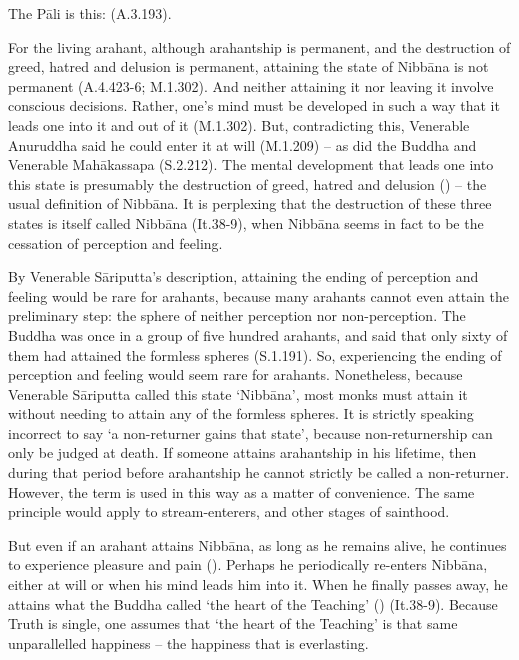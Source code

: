 The Pāli is this:  (A.3.193).

For the living arahant, although arahantship is permanent, and the destruction of greed, hatred and delusion is permanent, attaining the state of Nibbāna is not permanent (A.4.423-6; M.1.302). And neither attaining it nor leaving it involve conscious decisions. Rather, one's mind must be developed in such a way that it leads one into it and out of it (M.1.302). But, contradicting this, Venerable Anuruddha said he could enter it at will (M.1.209) -- as did the Buddha and Venerable Mahākassapa (S.2.212). The mental development that leads one into this state is presumably the destruction of greed, hatred and delusion () -- the usual definition of Nibbāna. It is perplexing that the destruction of these three states is itself called Nibbāna (It.38-9), when Nibbāna seems in fact to be the cessation of perception and feeling.

By Venerable Sāriputta's description, attaining the ending of perception and feeling would be rare for arahants, because many arahants cannot even attain the preliminary step: the sphere of neither perception nor non-perception. The Buddha was once in a group of five hundred arahants, and said that only sixty of them had attained the formless spheres (S.1.191). So, experiencing the ending of perception and feeling would seem rare for arahants. Nonetheless, because Venerable Sāriputta called this state `Nibbāna', most monks must attain it without needing to attain any of the formless spheres. It is strictly speaking incorrect to say `a non-returner gains that state', because non-returnership can only be judged at death. If someone attains arahantship in his lifetime, then during that period before arahantship he cannot strictly be called a non-returner. However, the term is used in this way as a matter of convenience. The same principle would apply to stream-enterers, and other stages of sainthood.

But even if an arahant attains Nibbāna, as long as he remains alive, he continues to experience pleasure and pain (). Perhaps he periodically re-enters Nibbāna, either at will or when his mind leads him into it. When he finally passes away, he attains what the Buddha called `the heart of the Teaching' () (It.38-9). Because Truth is single, one assumes that `the heart of the Teaching' is that same unparallelled happiness -- the happiness that is everlasting.

